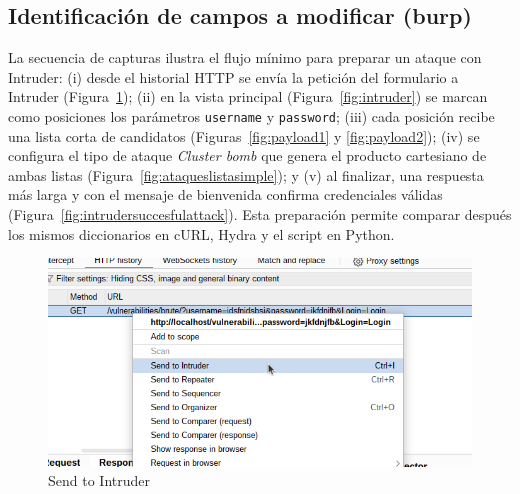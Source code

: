 \documentclass[letterpaper,12pt]{article}
\let\origsubsection\subsection
\renewcommand{\subsection}{\FloatBarrier\origsubsection}
\begin{document}
\subsection{Identificación de campos a modificar (burp)}
La secuencia de capturas ilustra el flujo mínimo para preparar un ataque con Intruder: (i) desde el historial HTTP se envía la petición del formulario a Intruder (Figura~\ref{fig:sendtointuder}); (ii) en la vista principal (Figura~\ref{fig:intruder}) se marcan como posiciones los parámetros \texttt{username} y \texttt{password}; (iii) cada posición recibe una lista corta de candidatos (Figuras~\ref{fig:payload1} y \ref{fig:payload2}); (iv) se configura el tipo de ataque \emph{Cluster bomb} que genera el producto cartesiano de ambas listas (Figura~\ref{fig:ataqueslistasimple}); y (v) al finalizar, una respuesta más larga y con el mensaje de bienvenida confirma credenciales válidas (Figura~\ref{fig:intrudersuccesfulattack}). Esta preparación permite comparar después los mismos diccionarios en cURL, Hydra y el script en Python.
\begin{figure}
    \centering
    \includegraphics[width=1\linewidth]{identificaryobtenercamposburp/Captura desde 2025-10-01 23-19-38.png}
    \caption{Send to Intruder}
    \label{fig:sendtointuder}
\end{figure}
\end{document}
